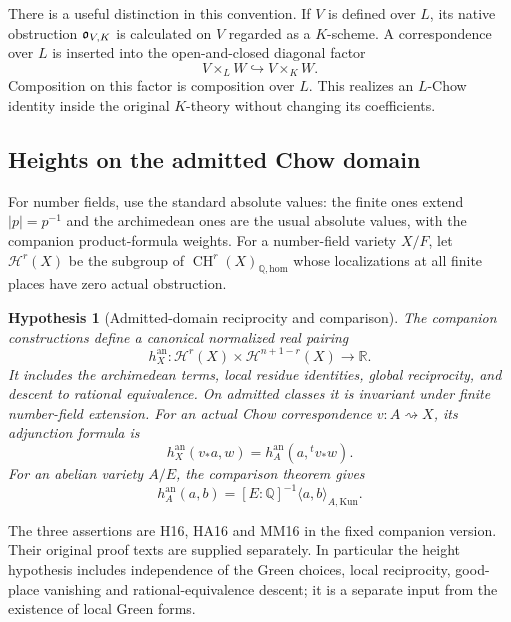 \documentclass[11pt,a4paper]{article}
\newtheorem{hypothesis}[theorem]{Hypothesis}
\theoremstyle{definition}
\theoremstyle{remark}\newtheorem{remark}[theorem]{Remark}
\numberwithin{equation}{section}
\newcommand{\Q}{\mathbb Q}\newcommand{\R}{\mathbb R}\newcommand{\C}{\mathbb C}
\newcommand{\CH}{\operatorname{CH}}\newcommand{\an}{\mathrm{an}}
\newcommand{\homol}{\mathrm{hom}}\newcommand{\BC}{\mathrm{BC}}
\begin{document}
There is a useful distinction in this convention. If $V$ is defined
over $L$, its native obstruction $\mathfrak o_{V,K}$ is calculated on $V$
regarded as a $K$-scheme. A correspondence over $L$ is inserted into
the open-and-closed diagonal factor
\[
       V\times_L W\hookrightarrow V\times_K W.
\]
Composition on this factor is composition over $L$. This realizes an
$L$-Chow identity inside the original $K$-theory without changing its
coefficients.

\subsection{Heights on the admitted Chow domain}\label{sub:height-input}

For number fields, use the standard absolute values: the finite ones
extend $|p|=p^{-1}$ and the archimedean ones are the usual absolute
values, with the companion product-formula weights. For a
number-field variety $X/F$, let $\mathcal H^r(X)$ be the subgroup
of $\CH^r(X)_{\Q,\homol}$ whose localizations at all finite places
have zero actual obstruction.

\begin{hypothesis}[Admitted-domain reciprocity and comparison]\label{hyp:height-input}
The companion constructions \cite{InternalHeight} define a canonical normalized real pairing
\[
 h_X^{\an}:\mathcal H^r(X)\times\mathcal H^{n+1-r}(X)\longrightarrow\R.
\]
It includes the archimedean terms, local residue identities, global
reciprocity, and descent to rational equivalence. On admitted classes
it is invariant under finite number-field extension. For an actual
Chow correspondence $v:A\rightsquigarrow X$, its adjunction formula is
\begin{equation}\label{eq:height-adjunction}
       h_X^{\an}(v_*a,w)=h_A^{\an}(a,{}^tv_*w).
\end{equation}
For an abelian variety $A/E$, the comparison theorem gives
\begin{equation}\label{eq:abelian-comparison}
       h_A^{\an}(a,b)=[E:\Q]^{-1}\langle a,b\rangle_{A,\mathrm{Kun}}.
\end{equation}
\end{hypothesis}

The three assertions are H16, HA16 and MM16 in the fixed companion version.
Their original proof texts are supplied separately. In particular the
height hypothesis includes independence of the Green choices, local
reciprocity, good-place vanishing and rational-equivalence descent;
it is a separate input from the existence of local Green forms.
\end{document}
